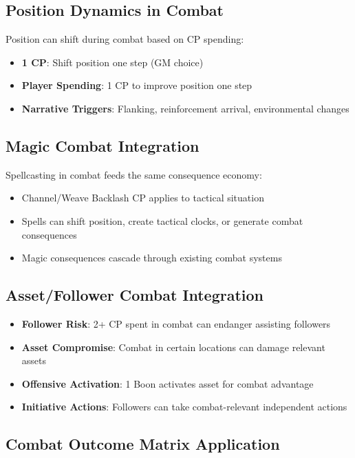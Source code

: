 \subsection*{Position Dynamics in Combat}

Position can shift during combat based on CP spending:

\begin{itemize}
    \item \textbf{1 CP}: Shift position one step (GM choice)
    \item \textbf{Player Spending}: 1 CP to improve position one step
    \item \textbf{Narrative Triggers}: Flanking, reinforcement arrival, environmental changes
\end{itemize}

\subsection*{Magic Combat Integration}

Spellcasting in combat feeds the same consequence economy:

\begin{itemize}
    \item Channel/Weave Backlash CP applies to tactical situation
    \item Spells can shift position, create tactical clocks, or generate combat consequences
    \item Magic consequences cascade through existing combat systems
\end{itemize}

\subsection*{Asset/Follower Combat Integration}

\begin{itemize}
    \item \textbf{Follower Risk}: 2+ CP spent in combat can endanger assisting followers
    \item \textbf{Asset Compromise}: Combat in certain locations can damage relevant assets  
    \item \textbf{Offensive Activation}: 1 Boon activates asset for combat advantage
    \item \textbf{Initiative Actions}: Followers can take combat-relevant independent actions
\end{itemize}

\subsection*{Combat Outcome Matrix Application}

